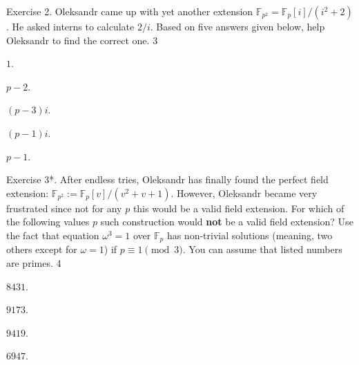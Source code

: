 \documentclass[../../book.tex]{subfiles}
\begin{document}
\begin{xexercise}
    {Exercise 2.}
    {Oleksandr came up with yet another extension $\mathbb{F}_{p^2} = \mathbb{F}_p[i]/(i^2+2)$. He asked interns to calculate $2/i$. Based on five answers given below, help Oleksandr to find the correct one.}
    {3}
    {
        \item $1$.
        \item $p-2$.
        \item $(p-3)i$.
        \item $(p-1)i$.
        \item $p-1$.
    }
\end{xexercise}

\begin{xexercise}
    {Exercise 3*.}
    {After endless tries, Oleksandr has finally found the perfect field extension: $\mathbb{F}_{p^2} := \mathbb{F}_p[v] / (v^2+v+1)$. However, Oleksandr became very frustrated since not for any $p$ this would be a valid field extension. For which of the following values $p$ such construction would \textbf{not} be a valid field extension? Use the fact that equation $\omega^3=1$ over $\mathbb{F}_p$ has non-trivial solutions (meaning, two others except for $\omega=1$) if $p \equiv 1 \pmod{3}$. You can assume that listed numbers are primes.}
    {4}
    {
        \item $8431$.
        \item $9173$.
        \item $9419$.
        \item $6947$.
    }
\end{xexercise}
\end{document}
